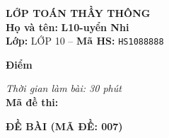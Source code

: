 \noindent
\begin{tcolorbox}[colback=white,colframe=black,arc=0mm,boxrule=0.8pt,top=4pt,bottom=4pt,left=6pt,right=6pt]
	\begin{minipage}[c]{0.44\textwidth}
		{\bfseries\large LỚP TOÁN THẦY THÔNG}\\[3pt]
		\textbf{Họ và tên:} \textbf{\large L10-uyển Nhi}\\[3pt]
		\textbf{Lớp:} LỚP 10 \quad -- \quad \textbf{Mã HS:} \texttt{HS1088888}
	\end{minipage}
	\hfill
	\begin{minipage}[c]{0.22\textwidth}
		\begin{tcolorbox}[colback=white,colframe=black,arc=0mm,boxrule=0.6pt,height=1.8cm,halign=center,valign=top,top=2pt]
			{\bfseries\normalsize Điểm}
		\end{tcolorbox}
	\end{minipage}
	\hfill
	\begin{minipage}[c]{0.30\textwidth}
		\raggedleft
		\textit{Thời gian làm bài: 30 phút}\\[4pt]
		\textbf{Mã đề thi:} 
	\end{minipage}
\end{tcolorbox}
\vspace{0.25cm}

\noindent\textbf{\large ĐỀ BÀI (MÃ ĐỀ: 007)}
\vspace{0.1cm}

